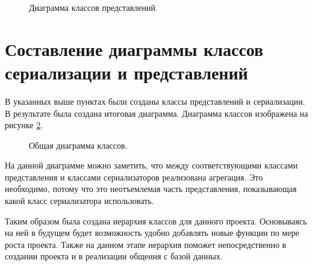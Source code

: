         \begin{figure}[H]%
            \centering
            \caption{Диаграмма классов представлений.} \label{class-diagram-views}
        \end{figure} 
    
    \section{Составление диаграммы классов сериализации и представлений}
        В указанных выше пунктах были созданы классы представлений и сериализации. %
        В результате была создана итоговая диаграмма. Диаграмма классов изображена на рисунке %
        \ref{class-diagram-views-serializer}.

        \begin{landscape}
            \begin{figure}[H]%
                \centering
                \caption{Общая диаграмма классов.} \label{class-diagram-views-serializer}
            \end{figure}
        \end{landscape}
        
        На данной диаграмме можно заметить, что между соответствующими классами %
        представления и классами сериализаторов реализована агрегация. Это необходимо, %
        потому что это неотъемлемая часть представления, показывающая какой класс %
        сериализатора использовать. 

        Таким образом была создана иерархия классов для данного проекта. Основываясь на %
        ней в будущем будет возможность удобно добавлять новые функции по %
        мере роста проекта. Также на данном этапе иерархия поможет непосредственно в %
        создании проекта и в реализации общения с базой данных.